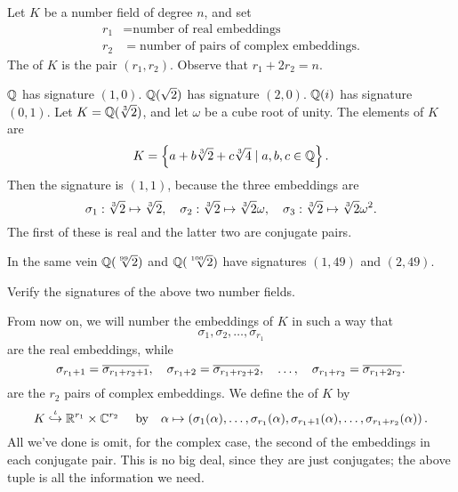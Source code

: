 \begin{definition}
	Let $K$ be a number field of degree $n$, and set
	\begin{align*}
		r_1 &= \text{number of real embeddings} \\
		r_2 &= \text{number of pairs of complex embeddings}.
	\end{align*}
	The  of $K$ is the pair $(r_1, r_2)$.
	Observe that $r_1 + 2r_2 = n$.
\end{definition}
\begin{example}
	\listhack
	\begin{enumerate}[(a)]
		\ii $\mathbb Q$ has signature $(1,0)$.
		\ii $\mathbb Q(\sqrt 2)$ has signature $(2,0)$.
		\ii $\mathbb Q(i)$ has signature $(0,1)$.
		\ii Let $K = \mathbb Q(\sqrt[3]{2})$, and let $\omega$ be a cube root of unity.
		The elements of $K$ are
		\[ K = \left\{ a + b\sqrt[3]{2} + c\sqrt[3]{4} \mid a,b,c \in \mathbb Q  \right\}. \]
		Then the signature is $(1,1)$, because the three embeddings are
		\[ \sigma_1 : \sqrt[3]{2} \mapsto \sqrt[3]{2},
			\quad
			\sigma_2 : \sqrt[3]{2} \mapsto \sqrt[3]{2} \omega,
			\quad
			\sigma_3 : \sqrt[3]{2} \mapsto \sqrt[3]{2} \omega^2. \]
		The first of these is real and the latter two are conjugate pairs.
	\end{enumerate}
\end{example}
\begin{example}
	In the same vein $\mathbb Q(\sqrt[99]{2})$ and $\mathbb Q(\sqrt[100]{2})$
	have signatures $(1,49)$ and $(2,49)$.
\end{example}
\begin{ques}
	Verify the signatures of the above two number fields.
\end{ques}

From now on, we will number the embeddings of $K$ in such a way that
\[ \sigma_1, \sigma_2, \dots, \sigma_{r_1}  \]are the real embeddings,
while 
\[
	\sigma_{r_1+1} = \overline{\sigma_{r_1+r_2+1}}, \quad
	\sigma_{r_1+2} = \overline{\sigma_{r_1+r_2+2}}, \quad
	\dots, \quad
	\sigma_{r_1+r_2} = \overline{\sigma_{r_1+2r_2}}.
\]
are the $r_2$ pairs of complex embeddings.
We define the  of $K$ by
\[
	K \overset\iota{\hookrightarrow} \mathbb R^{r_1} \times \mathbb C^{r_2} \
	\quad\text{by}\quad
	\alpha \mapsto  \left( \sigma_1(\alpha), \dots, \sigma_{r_1}(\alpha),
	\sigma_{r_1+1}(\alpha), \dots, \sigma_{r_1+r_2}(\alpha) \right). 
\]
All we've done is omit, for the complex case, the second of the embeddings in each conjugate pair.
This is no big deal, since they are just conjugates;
the above tuple is all the information we need.

